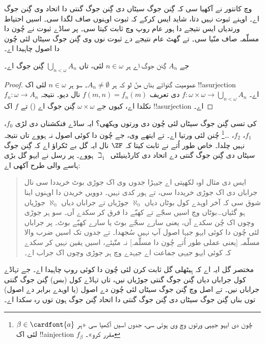 \documentclass[../../../include/open-logic-section]{subfiles}
\begin{document}
\begin{ex}
\citeyear{Cantor1878} وچ کانتور نے آکھیا سی کہ گِنن جوگ سیٹاں دی گِنن جوگ گنتی دا اتحاد وی گِنن جوگ اے۔ اوہنے ثبوت نہیں دتا، شاید ایس کرکے کہ ثبوت اوہنوں صاف لگدا سی۔ اسیں احتیاط ورتدیاں ایس نتیجے دا ہور عام روپ  وچ ثابت کیتا سی۔ پر ساڈے ثبوت نے چُون دا مسلّمہ صاف منّیا سی۔ تے گھٹ عام نتیجے دے ثبوت نوں وی گِنن جوگ سیٹاں لئی چُون دا اصول چاہیدا اے۔

\begin{thm}
جے $A_n$ گِنن جوگ اے ہر $n \in \omega$ لئی، تاں $\bigcup_{n <
\omega} A_n$ گِنن جوگ اے۔
\end{thm}

\begin{proof}
عمومیت گنوائے بناں منّ لو کہ ہر $A_n \neq \emptyset$۔ سو ہر $n \in \omega$ لئی اک !!a{surjection} $f_n \colon \omega
\to A_n$ اے۔ $f \colon \omega \times \omega \to \bigcup_{n <
\omega} A_n$ دی تعریف $f(m, n) = f_n(m)$ نال دیو۔ نتیجہ نکلدا اے، کیوں جے $\omega
\times \omega$ گِنن جوگ اے () تے $f$ اک !!a{surjection} اے۔
\end{proof}
\noindent
کی تسی گِنن جوگ سیٹاں لئی چُون دی ورتوں ویکھی؟ ایہ ساڈے فنکشناں دی لڑی $f_0$، $f_1$، $f_2$، \dots\footnote{چُون دی ایہو جیہی ورتوں  وچ وی ہوئی سی، جدوں اسیں آکھیا سی «ہر $\beta \in \cardfont{a}$ لئی اک !!a{injection}
$f_\beta$ مقرر کرو»۔} چُنن لئی ورتیا اے۔ تے ایتھے وی، جے چُون دا کوئی اصول نہ ہووے تاں نتیجہ نہیں چلدا۔ خاص طور اُتے \citet{FefermanLevy1963} نے ثابت کیتا کہ $\ZF$ نال ایہ گل بے ٹکراؤ اے کہ گِنن جوگ سیٹاں دی گِنن جوگ گنتی دے اتحاد دی کارڈینیلٹی~$\beth_1$ ہووے۔ پر رسل نے ایہو گل بڑی ہاسے والی طرح آکھی اے:
\begin{quote}
  ایس دی مثال اوہ لکھپتی اے جیہڑا جدوں وی اک جوڑی بوٹ خریددا سی نال جراباں دی اک جوڑی خریددا سی، تے ہور کدی نہیں۔ دوویں خریدن دا اوہنوں اینا شوق سی کہ آخر اوہدے کول بوٹاں دیاں $\aleph_0$ جوڑیاں تے جراباں دیاں $\aleph_0$ جوڑیاں ہو گئیاں\dots\@ بوٹاں وچ اسیں سجّے تے کھبّے دا فرق کر سکدے آں۔ سو ہر جوڑی وچوں اک چُن سکدے آں، یعنی سارے سجّے بوٹ یا سارے کھبّے بوٹ۔ پر جراباں لئی چُون دا کوئی ایہو جیہا اصول آپ نہیں سُجھدا۔ تے جدوں تک اسیں ضرب والا مسلّمہ [یعنی عملی طور اُتے چُون دا مسلّمہ] نہ منّیئے، اسیں یقین نہیں کر سکدے کہ کوئی ایہو جیہی جماعت اے جیہدے وچ ہر جوڑی وچوں اک جراب اے۔
  \citep[p.~126]{Russell1919}
\end{quote}
مختصر گل ایہ اے کہ ہِیٹھلی گل ثابت کرن لئی چُون دا کوئی روپ چاہیدا اے۔ جے تہاڈے کول جراباں دیاں گِنن جوگ گنتی جوڑیاں نیں، تاں تہاڈے کول (بس) گِنن جوگ گنتی جراباں نیں۔ تے اصل وچ گِنن جوگ سیٹاں لئی چُون دے اصول (یا اوہدے برابر دے اصول) توں بناں گِنن جوگ سیٹاں دی گِنن جوگ گنتی دا اتحاد گِنن جوگ ہون توں رہ سکدا اے۔
\end{ex}
\end{document}
